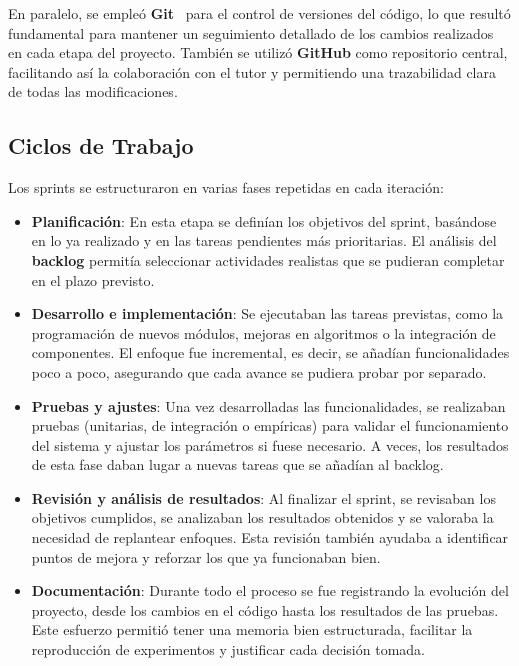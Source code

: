 En paralelo, se empleó \textbf{Git}~\cite{chaconProGit2014} para el control de versiones del código, lo que resultó
fundamental para mantener un seguimiento detallado de los cambios realizados en cada etapa del proyecto.
También se utilizó \textbf{GitHub} como repositorio central, facilitando así la colaboración con el tutor y permitiendo
una trazabilidad clara de todas las modificaciones.


\subsection{Ciclos de Trabajo}\label{subsec:ciclos-de-trabajo}
Los sprints se estructuraron en varias fases repetidas en cada iteración:

\begin{itemize}
    \item \textbf{Planificación}: En esta etapa se definían los objetivos del sprint, basándose en lo ya realizado y en
          las tareas pendientes más prioritarias.
          El análisis del \textbf{backlog} permitía seleccionar actividades realistas que se pudieran completar en el plazo
          previsto.

    \item \textbf{Desarrollo e implementación}: Se ejecutaban las tareas previstas, como la programación de nuevos
          módulos, mejoras en algoritmos o la integración de componentes.
          El enfoque fue incremental, es decir, se añadían funcionalidades poco a poco, asegurando que cada avance se pudiera
          probar por separado.

    \item \textbf{Pruebas y ajustes}: Una vez desarrolladas las funcionalidades, se realizaban pruebas (unitarias, de
          integración o empíricas) para validar el funcionamiento del sistema y ajustar los parámetros si fuese necesario.
          A veces, los resultados de esta fase daban lugar a nuevas tareas que se añadían al backlog.

    \item \textbf{Revisión y análisis de resultados}: Al finalizar el sprint, se revisaban los objetivos cumplidos, se
          analizaban los resultados obtenidos y se valoraba la necesidad de replantear enfoques.
          Esta revisión también ayudaba a identificar puntos de mejora y reforzar los que ya funcionaban bien.

    \item \textbf{Documentación}: Durante todo el proceso se fue registrando la evolución del proyecto, desde los
          cambios en el código hasta los resultados de las pruebas.
          Este esfuerzo permitió tener una memoria bien estructurada, facilitar la reproducción de experimentos y justificar cada
          decisión tomada.
\end{itemize}


